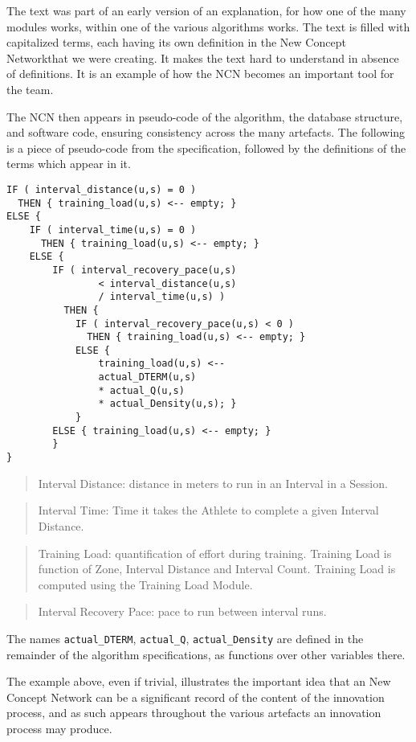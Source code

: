 \documentclass[graybox,envcountchap,sectrefs]{svmono}
\newcommand{\ncn}{NCN}
\newcommand{\ncnf}{New Concept Network}
\newcommand{\newterm}[1]{\begin{quote}\textsf{#1}\end{quote}}
\begin{document}
The text was part of an early version of an explanation, for how one of the many modules works, within one of the various algorithms works. The text is filled with capitalized terms, each having its own definition in the \ncnf that we were creating. It makes the text hard to understand in absence of definitions. It is an example of how the \ncn{} becomes an important tool for the team. 

The \ncn{} then appears in pseudo-code of the algorithm, the database structure, and software code, ensuring consistency across the many artefacts. The following is a piece of pseudo-code from the specification, followed by the definitions of the terms which appear in it.

\small{
\begin{verbatim}
IF ( interval_distance(u,s) = 0 ) 
  THEN { training_load(u,s) <-- empty; }
ELSE {
    IF ( interval_time(u,s) = 0 ) 
      THEN { training_load(u,s) <-- empty; }
    ELSE {
        IF ( interval_recovery_pace(u,s)
                < interval_distance(u,s) 
                / interval_time(u,s) )
          THEN {
            IF ( interval_recovery_pace(u,s) < 0 ) 
              THEN { training_load(u,s) <-- empty; }
            ELSE {
                training_load(u,s) <-- 
                actual_DTERM(u,s) 
                * actual_Q(u,s) 
                * actual_Density(u,s); }
            }
        ELSE { training_load(u,s) <-- empty; } 
        }
}
\end{verbatim}}

\newterm{Interval Distance: distance in meters to run in an Interval in a Session.}

\newterm{Interval Time: Time it takes the Athlete to complete a given Interval Distance.}

\newterm{Training Load: quantification of effort during training. Training Load is function of Zone, Interval Distance and Interval Count. Training Load is computed using the Training Load Module.}

\newterm{Interval Recovery Pace: pace to run between interval runs.}

The names \verb|actual_DTERM|, \verb|actual_Q|, \verb|actual_Density| are defined in the remainder of the algorithm specifications, as functions over other variables there.

The example above, even if trivial, illustrates the important idea that an \ncnf{} can be a significant record of the content of the innovation process, and as such appears throughout the various artefacts an innovation process may produce.
\end{document}
